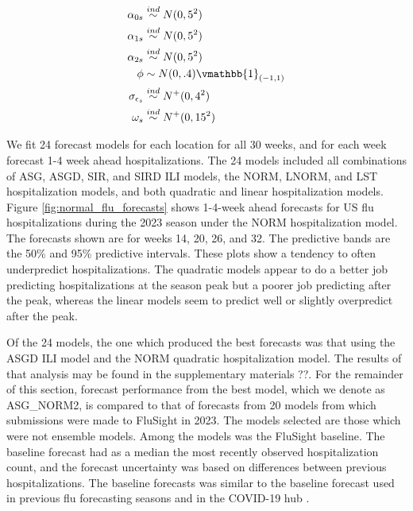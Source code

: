 \begin{equation}
\begin{aligned}
\label{eq:shared_hosp_priors}
        \alpha_{0s} &\overset{ind}{\sim} N(0, 5^2)\\
        \alpha_{1s} &\overset{ind}{\sim} N(0, 5^2)\\
        \alpha_{2s} &\overset{ind}{\sim} N(0, 5^2) \\
        \phi &\sim N(0, .4)\vmathbb{1}_{(-1,1)} \\
        \sigma_{\epsilon_s} &\overset{ind}{\sim} N^+(0, 4^2) \\
        \omega_s &\overset{ind}{\sim} N^+(0, 15^2)
\end{aligned}
\end{equation}






We fit 24 forecast models for each location for all 30 weeks, and for each 
week forecast 1-4 week ahead hospitalizations. The 24 models included all 
combinations of ASG, ASGD, SIR, and SIRD ILI models, the NORM, LNORM, and LST 
hospitalization models, and both quadratic and linear hospitalization models.
Figure \ref{fig:normal_flu_forecasts} shows 1-4-week ahead forecasts for US 
flu hospitalizations during the 2023 season under the NORM hospitalization 
model. The forecasts shown are for weeks 14, 20, 26, and 32. The predictive 
bands are the 50\% and 95\% predictive intervals.
These plots show a tendency to often underpredict hospitalizations. The 
quadratic models appear to do a better job predicting  hospitalizations at 
the season peak but a poorer job predicting after the peak, whereas the linear 
models seem to predict well or slightly overpredict after the peak. 

Of the 24 models, the one which produced the best forecasts was that using
the ASGD ILI model and the NORM quadratic hospitalization model. The results of
that analysis may be found in the supplementary materials ??. For the remainder 
of this section, forecast performance from the best model, which we denote
as ASG\_NORM2, is compared to that of forecasts from 20 models from which
submissions were made to FluSight in 2023. 
The models selected are those which were not ensemble models. Among the models
was the FluSight baseline. The baseline forecast had as a median the most 
recently observed 
hospitalization count, and the forecast uncertainty was based on 
differences between 
previous hospitalizations. The baseline forecasts was
similar to the baseline forecast used in
previous flu forecasting seasons and in the COVID-19 hub 
\cite[]{mathis2024evaluation, Cramer2022-hub-dataset}.

